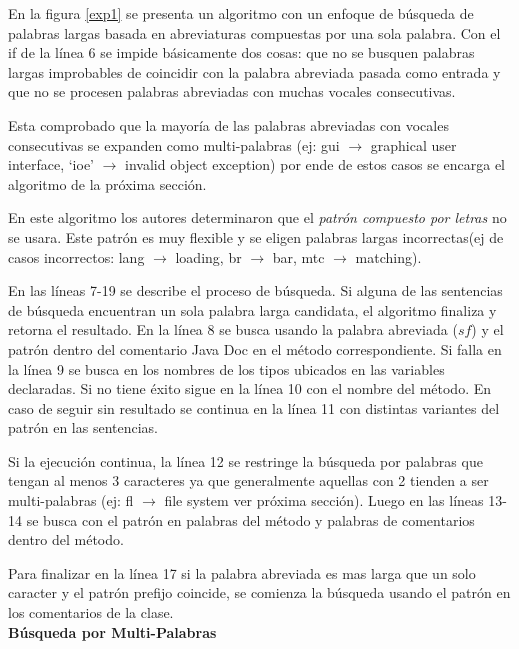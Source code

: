 \documentclass[12pt]{report}
\begin{document}
En la figura \ref{exp1} se presenta un algoritmo\cite{EZH08} con un enfoque de búsqueda de palabras largas basada en abreviaturas compuestas por una sola palabra. Con el \textsf{if} de la línea 6 se impide básicamente dos cosas: que no se busquen palabras largas improbables de coincidir con la palabra abreviada pasada como entrada y que no se procesen palabras abreviadas con muchas vocales consecutivas. 

Esta comprobado que la mayoría de las palabras abreviadas con vocales consecutivas se expanden como multi-palabras (ej: gui $\rightarrow$ graphical user interface, ‘ioe’ $\rightarrow$ invalid object exception) por ende de estos casos se encarga el algoritmo de la próxima sección.

En este algoritmo los autores determinaron que el \textit{patrón compuesto por letras} no se usara. Este patrón es muy flexible y se eligen palabras largas incorrectas(ej de casos incorrectos: lang $\rightarrow$ loading, br $\rightarrow$ bar, mtc $\rightarrow$ matching).

En las líneas 7-19 se describe el proceso de búsqueda. Si alguna de las sentencias de búsqueda encuentran un sola palabra larga candidata, el algoritmo finaliza y retorna el resultado. En la línea 8 se busca usando la palabra abreviada ($sf$) y el patrón dentro del comentario Java Doc en el método correspondiente. Si falla en la línea 9 se busca en los nombres de los tipos ubicados en las variables declaradas. Si no tiene éxito sigue en la línea 10 con el nombre del método. En caso de seguir sin resultado se continua en la línea 11 con distintas variantes del patrón en las sentencias.

Si la ejecución continua, la línea 12 se restringe la búsqueda por palabras que tengan al menos 3 caracteres ya que generalmente aquellas con 2 tienden a ser multi-palabras (ej: \textsf{fl $\rightarrow$ file system} ver próxima sección). Luego en las líneas 13-14 se busca con el patrón en palabras del método y palabras de comentarios dentro del método.

Para finalizar en la línea 17 si la palabra abreviada es mas larga que un solo caracter y el patrón prefijo coincide, se comienza la búsqueda usando el patrón en los comentarios de la clase.\\

\noindent \textbf{Búsqueda por Multi-Palabras\\}
\end{document}
